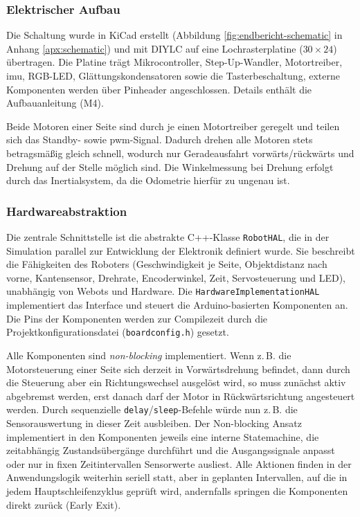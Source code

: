 \subsubsection*{Elektrischer Aufbau}

Die Schaltung wurde in KiCad erstellt (Abbildung \ref{fig:endbericht-schematic} in Anhang \ref{apx:schematic}) und mit DIYLC auf eine Lochrasterplatine ($30 \times 24$) übertragen. Die Platine trägt Mikrocontroller, Step-Up-Wandler, Motortreiber, \acrshort{imu}, RGB-LED, Glättungskondensatoren sowie die Tasterbeschaltung, externe Komponenten werden über Pinheader angeschlossen. Details enthält die Aufbauanleitung (M4).


Beide Motoren einer Seite sind durch je einen Motortreiber geregelt und teilen sich das Standby- sowie \acrshort{pwm}-Signal. Dadurch drehen alle Motoren stets betragsmäßig gleich schnell, wodurch nur Geradeausfahrt vorwärts/rückwärts und Drehung auf der Stelle möglich sind. Die Winkelmessung bei Drehung erfolgt durch das Inertialsystem, da die Odometrie hierfür zu ungenau ist. 

\subsubsection*{Hardwareabstraktion}

Die zentrale Schnittstelle ist die abstrakte C++-Klasse \texttt{RobotHAL}, die in der Simulation parallel zur Entwicklung der Elektronik definiert wurde. Sie beschreibt die Fähigkeiten des Roboters (Geschwindigkeit je Seite, Objektdistanz nach vorne, Kantensensor, Drehrate, Encoderwinkel, Zeit, Servosteuerung und LED), unabhängig von Webots und Hardware. Die \texttt{HardwareImplementationHAL} implementiert das Interface und steuert die Arduino-basierten Komponenten an. Die Pins der Komponenten werden zur Compilezeit durch die Projektkonfigurationsdatei (\texttt{boardconfig.h}) gesetzt. 


Alle Komponenten sind \textit{non-blocking} implementiert. Wenn z.\,B. die Motorsteuerung einer Seite sich derzeit in Vorwärtsdrehung befindet, dann durch die Steuerung aber ein Richtungswechsel ausgelöst wird, so muss zunächst aktiv abgebremst werden, erst danach darf der Motor in Rückwärtsrichtung angesteuert werden. Durch sequenzielle \texttt{delay}/\texttt{sleep}-Befehle würde nun z.\,B. die Sensorauswertung in dieser Zeit ausbleiben. Der Non-blocking Ansatz implementiert in den Komponenten jeweils eine interne Statemachine, die zeitabhängig Zustandsübergänge durchführt und die Ausgangssignale anpasst oder nur in fixen Zeitintervallen Sensorwerte ausliest. Alle Aktionen finden in der Anwendungslogik weiterhin seriell statt, aber in geplanten Intervallen, auf die in jedem Hauptschleifenzyklus geprüft wird, andernfalls springen die Komponenten direkt zurück (Early Exit).


